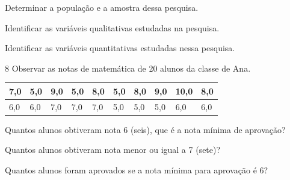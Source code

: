 \begin{escolha}
\item
  Determinar a população e a amostra dessa pesquisa.


\reduline{\mbox{}\hfill}

\reduline{\mbox{}\hfill}

\item
  Identificar as variáveis qualitativas estudadas na pesquisa.


\reduline{\mbox{}\hfill}

\reduline{\mbox{}\hfill}

\item
  Identificar as variáveis quantitativas estudadas nessa pesquisa.


\reduline{\mbox{}\hfill}

\reduline{\mbox{}\hfill}
\end{escolha}

\pagebreak
\num{8} Observar as notas de matemática de 20 alunos da classe de Ana.

\begin{longtable}[]{@{}llllllllll@{}}
\toprule
7,0 & 5,0 & 9,0 & 5,0 & 8,0 & 5,0 & 8,0 & 9,0 & 10,0 &
8,0\tabularnewline
\midrule
\endhead
6,0 & 6,0 & 7,0 & 7,0 & 7,0 & 5,0 & 5,0 & 5,0 & 6,0 & 6,0\tabularnewline
\bottomrule
\end{longtable}

\begin{escolha}
\item
  Quantos alunos obtiveram nota 6 (seis), que é a nota mínima de aprovação?


\reduline{\mbox{}\hfill}

\reduline{\mbox{}\hfill}

\item
  Quantos alunos obtiveram nota menor ou igual a 7 (sete)?


\reduline{\mbox{}\hfill}

\reduline{\mbox{}\hfill}

\item
  Quantos alunos foram aprovados se a nota mínima para aprovação é 6?


\reduline{\mbox{}\hfill}

\reduline{\mbox{}\hfill}
\end{escolha}

